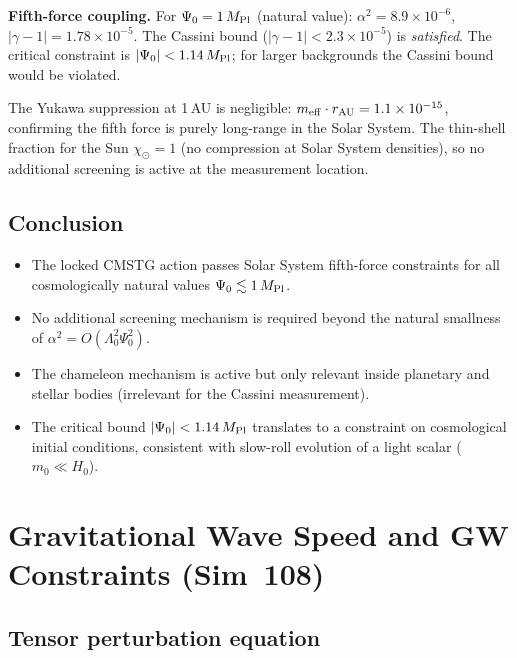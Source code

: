 \documentclass[12pt,a4paper]{article}
\begin{document}
\textbf{Fifth-force coupling.}
For $\Psi_0 = 1\,M_{\rm Pl}$ (natural value):
$\alpha^2 = 8.9\times10^{-6}$,
$|\gamma-1| = 1.78\times10^{-5}$.
The Cassini bound ($|\gamma-1|<2.3\times10^{-5}$) is \emph{satisfied}.
The critical constraint is $|\Psi_0| < 1.14\,M_{\rm Pl}$; for larger backgrounds
the Cassini bound would be violated.

The Yukawa suppression at 1\,AU is negligible:
$m_{\rm eff}\cdot r_{\rm AU} = 1.1\times10^{-15}$, confirming the fifth force is
purely long-range in the Solar System.  The thin-shell fraction for the Sun
$\chi_\odot = 1$ (no compression at Solar System densities), so no
additional screening is active at the measurement location.

\subsection{Conclusion}

\begin{itemize}
  \item The locked CMSTG action passes Solar System fifth-force constraints
        for all cosmologically natural values $\Psi_0 \lesssim 1\,M_{\rm Pl}$.
  \item No additional screening mechanism is required beyond the natural
        smallness of $\alpha^2 = O(\Lambda_0^2\Psi_0^2)$.
  \item The chameleon mechanism is active but only relevant inside planetary
        and stellar bodies (irrelevant for the Cassini measurement).
  \item The critical bound $|\Psi_0| < 1.14\,M_{\rm Pl}$ translates to a
        constraint on cosmological initial conditions, consistent with slow-roll
        evolution of a light scalar ($m_0 \ll H_0$).
\end{itemize}

\section{Gravitational Wave Speed and GW Constraints (Sim~108)}
\label{sec:sim108}

\subsection{Tensor perturbation equation}
\end{document}
